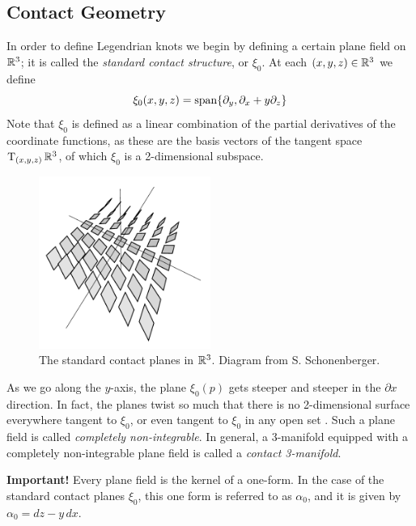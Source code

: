 \subsection{Contact Geometry}

In order to define Legendrian knots we begin by defining a certain plane field on $\mathbb{R}^3$; it is called the \emph{standard contact structure}, or $\xi_0$. At each $(x, y, z) \in \mathbb{R}^3$ we define
\[
    \xi_0(x, y, z) = \operatorname{span} \{\partial_y, \partial_x + y\partial_z\}
\]
Note that $\xi_0$ is defined as a linear combination of the partial derivatives of the coordinate functions, as these are the basis vectors of the tangent space $\operatorname{T}_{(x, y, z)} \mathbb{R}^3$, of which $\xi_0$ is a 2-dimensional subspace.

\begin{figure}[ht]
    \centering
    \includegraphics[width=0.5\textwidth]{images/contact-planes.pdf}
    \caption{The standard contact planes in $\mathbb{R}^3$. Diagram from S. Schonenberger.}%
    \label{fig:contact-planes}
\end{figure}

As we go along the $y$-axis, the plane $\xi_0(p)$  gets steeper and steeper in the $\partial x$ direction. In fact, the planes twist so much that there is no 2-dimensional surface everywhere tangent to $\xi_0$, or even tangent to $\xi_0$ in any open set \cite{boothby}.
Such a plane field is called \emph{completely non-integrable}.
In general, a 3-manifold equipped with a completely non-integrable plane field is called a \emph{contact 3-manifold}.

\textbf{Important!} Every plane field is the kernel of a one-form. In the case of the standard contact planes $\xi_0$, this one form is referred to as $\alpha_0$, and it is given by $\alpha_0 = dz - y \, dx$.

